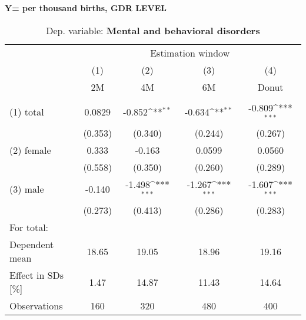 \documentclass[11pt, a4paper]{article} %
\begin{document}
\textbf{Y= per thousand births, GDR LEVEL}
 \begin{table}[htbp] \centering 
 \begin{threeparttable} \centering 
 \caption{Dep. variable: \textbf{Mental and behavioral disorders}} 
 {\def\sym#1{\ifmmode^{#1}\else\(^{#1}\)\fi} 
 \begin{tabular}{l*{4}{c}} \toprule & \multicolumn{4}{c}{Estimation window} \\ \cmidrule(lr){2-5}
	&\multicolumn{1}{c}{(1)}&\multicolumn{1}{c}{(2)}&\multicolumn{1}{c}{(3)}&\multicolumn{1}{c}{(4)}\\
    &\multicolumn{1}{c}{2M}&\multicolumn{1}{c}{4M}&\multicolumn{1}{c}{6M}&\multicolumn{1}{c}{Donut}\\
	\midrule
\\
(1) total	& 0.0829  &-0.852\sym{**} &-0.634\sym{**} & -0.809\sym{***} \\
			& (0.353) & (0.340) 		&(0.244)		&  (0.267) \\
(2) female	& 0.333   &	-0.163 & 0.0599 	 & 0.0560 \\
			& (0.558) & (0.350) & (0.260) &  (0.289) \\
(3) male & -0.140  & -1.498\sym{***} &  -1.267\sym{***} & -1.607\sym{***} \\
 		 & (0.273) &  (0.413)  & (0.286)    &  (0.283) \\
\midrule
For total: \\ 
Dependent mean &   18.65 & 19.05 & 18.96 & 19.16	\\ 
Effect in SDs [\%]  &  1.47 & 14.87 &  11.43 & 14.64 \\ 
Observations & 160 & 320 & 480 & 400 \\ 
\bottomrule
\end{tabular}}
\end{threeparttable} \end{table}
\end{document}
